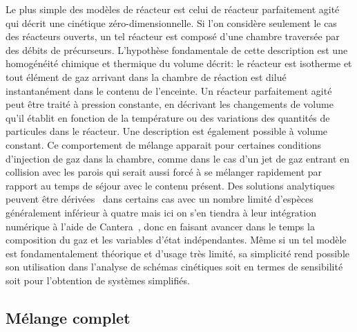 Le plus simple des modèles de réacteur est celui de \og{}réacteur parfaitement agité\fg{} qui décrit une cinétique zéro-dimensionnelle. Si l'on considère seulement le cas des réacteurs ouverts, un tel réacteur est composé d'une chambre traversée par des débits de précurseurs. L'hypothèse fondamentale de cette description est une homogénéité chimique et thermique du volume décrit: le réacteur est isotherme et tout élément de gaz arrivant dans la chambre de réaction est dilué instantanément dans le contenu de l'enceinte. Un réacteur parfaitement agité peut être traité à pression constante, en décrivant les changements de volume qu'il établit en fonction de la température ou des variations des quantités de particules dans le réacteur. Une description est également possible à volume constant. Ce comportement de mélange apparait pour certaines conditions d'injection de gaz dans la chambre, comme dans le cas d'un jet de gaz entrant en collision avec les parois qui serait aussi forcé à se mélanger rapidement \textendash{} par rapport au temps de séjour \textendash{} avec le contenu présent. Des solutions analytiques peuvent être dérivées~\cite{Fogler1999} dans certains cas avec un nombre limité d'espèces \textendash{} généralement inférieur à quatre \textendash{} mais ici on s'en tiendra à leur intégration numérique à l'aide de Cantera~\cite{Cantera2014}, donc en faisant avancer dans le temps la composition du gaz et les variables d'état indépendantes. Même si un tel modèle est fondamentalement théorique et d'usage très limité, sa simplicité rend possible son utilisation dans l'analyse de schémas cinétiques soit en termes de sensibilité~\cite{Turanyi1989} soit pour l'obtention de systèmes simplifiés.

\subsection{Mélange complet}
\label{sec:micromelange-complet}

